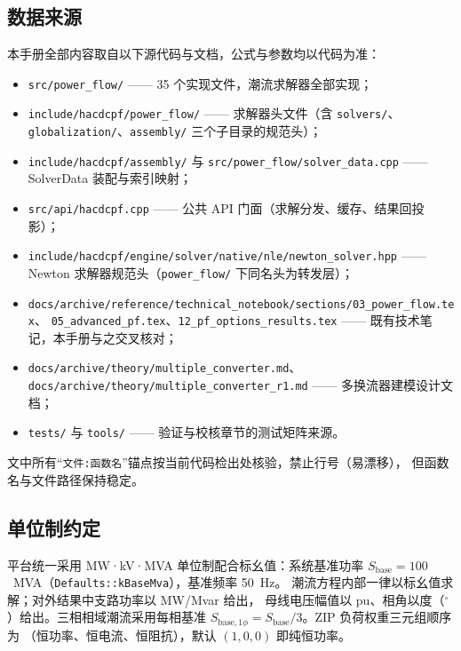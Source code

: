 \documentclass[UTF8,fontset=fandol,a4paper,11pt]{ctexart}
\begin{document}
\subsection{数据来源}
本手册全部内容取自以下源代码与文档，公式与参数均以代码为准：
\begin{itemize}
  \item \texttt{src/power\_flow/} —— 35 个实现文件，潮流求解器全部实现；
  \item \texttt{include/hacdcpf/power\_flow/} —— 求解器头文件（含 \texttt{solvers/}、
        \texttt{globalization/}、\texttt{assembly/} 三个子目录的规范头）；
  \item \texttt{include/hacdcpf/assembly/} 与 \texttt{src/power\_flow/solver\_data.cpp} ——
        SolverData 装配与索引映射；
  \item \texttt{src/api/hacdcpf.cpp} —— 公共 API 门面（求解分发、缓存、结果回投影）；
  \item \texttt{include/hacdcpf/engine/solver/native/nle/newton\_solver.hpp} ——
        Newton 求解器规范头（\texttt{power\_flow/} 下同名头为转发层）；
  \item \texttt{docs/archive/reference/technical\_notebook/sections/03\_power\_flow.tex}、
        \texttt{05\_advanced\_pf.tex}、\texttt{12\_pf\_options\_results.tex} ——
        既有技术笔记，本手册与之交叉核对；
  \item \texttt{docs/archive/theory/multiple\_converter.md}、\texttt{docs/archive/theory/multiple\_converter\_r1.md} ——
        多换流器建模设计文档；
  \item \texttt{tests/} 与 \texttt{tools/} —— 验证与校核章节的测试矩阵来源。
\end{itemize}
文中所有“\texttt{文件:函数名}”锚点按当前代码检出处核验，禁止行号（易漂移），
但函数名与文件路径保持稳定。

\subsection{单位制约定}
平台统一采用 MW·kV·MVA 单位制配合标幺值：系统基准功率
$S_{\mathrm{base}}=100$~MVA（\texttt{Defaults::kBaseMva}），基准频率 50~Hz。
潮流方程内部一律以标幺值求解；对外结果中支路功率以 MW/Mvar 给出，
母线电压幅值以 pu、相角以度（$^\circ$）给出。三相相域潮流采用每相基准
$S_{\mathrm{base},1\phi}=S_{\mathrm{base}}/3$。ZIP 负荷权重三元组顺序为
（恒功率、恒电流、恒阻抗），默认 $(1,0,0)$ 即纯恒功率。
\end{document}
